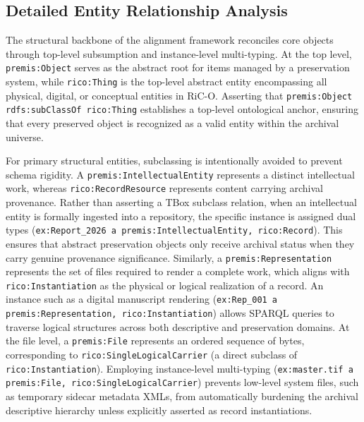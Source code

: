 \documentclass[runningheads]{llncs}
\begin{document}
\subsection{Detailed Entity Relationship Analysis}

The structural backbone of the alignment framework reconciles core objects through top-level subsumption and instance-level multi-typing. At the top level, \texttt{premis:Object} serves as the abstract root for items managed by a preservation system, while \texttt{rico:Thing} is the top-level abstract entity encompassing all physical, digital, or conceptual entities in RiC-O. Asserting that \texttt{premis:Object rdfs:subClassOf rico:Thing} establishes a top-level ontological anchor, ensuring that every preserved object is recognized as a valid entity within the archival universe.

For primary structural entities, subclassing is intentionally avoided to prevent schema rigidity. A \texttt{premis:IntellectualEntity} represents a distinct intellectual work, whereas \texttt{rico:RecordResource} represents content carrying archival provenance. Rather than asserting a TBox subclass relation, when an intellectual entity is formally ingested into a repository, the specific instance is assigned dual types (\texttt{ex:Report\_2026 a premis:IntellectualEntity, rico:Record}). This ensures that abstract preservation objects only receive archival status when they carry genuine provenance significance. Similarly, a \texttt{premis:Representation} represents the set of files required to render a complete work, which aligns with \texttt{rico:Instantiation} as the physical or logical realization of a record. An instance such as a digital manuscript rendering (\texttt{ex:Rep\_001 a premis:Representation, rico:Instantiation}) allows SPARQL queries to traverse logical structures across both descriptive and preservation domains. At the file level, a \texttt{premis:File} represents an ordered sequence of bytes, corresponding to \texttt{rico:SingleLogicalCarrier} (a direct subclass of \texttt{rico:Instantiation}). Employing instance-level multi-typing (\texttt{ex:master.tif a premis:File, rico:SingleLogicalCarrier}) prevents low-level system files, such as temporary sidecar metadata XMLs, from automatically burdening the archival descriptive hierarchy unless explicitly asserted as record instantiations.
\end{document}
